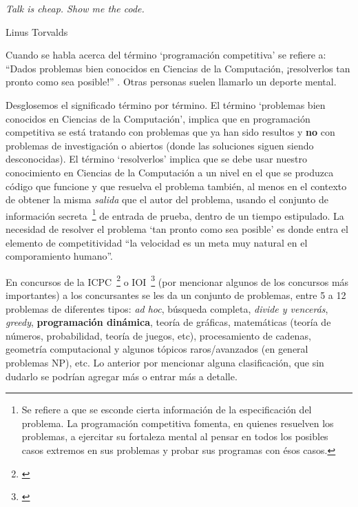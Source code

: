 \label{chap:prog_competitiva}
\epigraph{\itshape Talk is cheap. Show me the code.}{Linus Torvalds}

Cuando se habla acerca del término `programación competitiva' se refiere a: 
``Dados problemas bien conocidos en Ciencias de la Computación, ¡resolverlos 
tan pronto como sea posible!''
\cite{halim2013competitive}. Otras personas suelen llamarlo un deporte mental.

Desglosemos el significado término por término. El término `problemas bien 
conocidos en Ciencias de la Computación', implica que en programación 
competitiva se está tratando con problemas que ya han sido resultos y 
\textbf{no} con problemas de investigación o abiertos (donde las
soluciones siguen siendo desconocidas). El término `resolverlos' implica que se debe usar nuestro
conocimiento en Ciencias de la Computación a un nivel en el que se produzca código que funcione y
que resuelva el problema también, al menos en el contexto de obtener la misma \textit{salida} que
el autor del problema, usando el conjunto de información secreta~\footnote{
    Se refiere a que se esconde cierta información de la especificación del 
problema. La programación competitiva fomenta, en quienes resuelven los 
problemas, a ejercitar su fortaleza mental al pensar en todos los posibles 
casos extremos en sus problemas y probar sus programas con ésos casos.}
de entrada de prueba, dentro de un tiempo estipulado. La necesidad de resolver el problema `tan
pronto como sea posible' es donde entra el elemento de competitividad ``la velocidad es un
meta muy natural en el comporamiento humano''. \par

En concursos de la ICPC~\footnote{
    \cite{eswiki:135765381}
} o IOI~\footnote{
    \cite{eswiki:125950903}} (por mencionar algunos de los concursos más 
importantes) a los concursantes se les da un conjunto
de problemas, entre 5 a 12 problemas de diferentes tipos: \emph{ad hoc}, 
búsqueda completa, \emph{divide y vencerás}, \emph{greedy}, \textbf{programación 
dinámica}, teoría de gráficas, matemáticas (teoría de números, probabilidad, 
teoría de juegos, etc), procesamiento de cadenas, geometría computacional y 
algunos tópicos raros/avanzados (en general problemas NP), etc.
Lo anterior por mencionar alguna clasificación, que sin dudarlo se podrían 
agregar más o entrar más a detalle.

